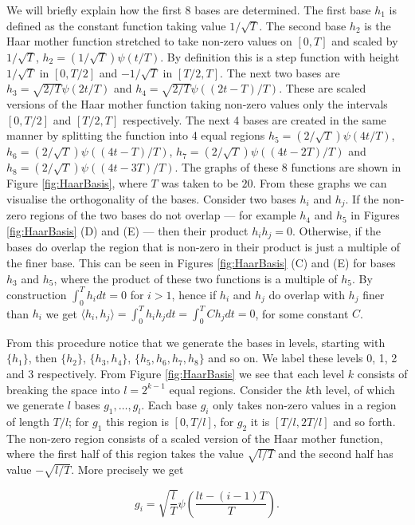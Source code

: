 \documentclass[../main.tex]{subfiles}
\begin{document}
 We will briefly explain how the first 8 bases are determined.  The first base $h_1$ is defined as the constant function taking value $1/ \sqrt T$. The second base $h_2$ is the Haar mother function stretched to take non-zero values on $[0,T]$ and scaled by $1/ \sqrt T$, $h_2 = (1/ \sqrt T)\psi(t/T)$. By definition this is a step function with  height $1/ \sqrt T$ in $[0,T/2]$ and $-1/ \sqrt T$ in $[T/2,T]$. The next two bases are $h_3 = \sqrt{2/T}\psi(2t/T)$ and $h_4 = \sqrt{2/T}\psi((2t-T)/T)$. These are scaled versions of the Haar mother function taking non-zero values only the intervals $[0,T/2]$ and $[T/2,T]$ respectively. The next 4 bases are created in the same manner by splitting the function into 4 equal regions $h_5 = (2/ \sqrt T)\psi(4t/T)$, $h_6 = (2/ \sqrt T)\psi((4t-T)/T)$, $h_7 = (2/ \sqrt T)\psi((4t-2T)/T)$ and $h_8 = (2/ \sqrt T)\psi((4t-3T)/T)$. The graphs of these 8 functions are shown in Figure \ref{fig:HaarBasis}, where $T$ was taken to be $20$. From these graphs we can visualise the orthogonality of the bases. Consider two bases $h_i$ and $h_j$. If the non-zero regions of the two bases do not overlap --- for example $h_4$ and $h_5$ in Figures \ref{fig:HaarBasis} (D) and (E) --- then their product $h_ih_j = 0$. Otherwise, if the bases do overlap the region that is non-zero in their product is just a multiple of the finer base. This can be seen in Figures \ref{fig:HaarBasis} (C) and (E) for bases $h_3$ and $h_5$, where the product of these two functions is a multiple of $h_5$. By construction $\int^T_0 h_i dt = 0$ for $i>1$, hence if $h_i$ and $h_j$ do overlap with $h_j$ finer than $h_i$ we get $\langle h_i,h_j \rangle = \int^T_0 h_i h_j dt = \int^T_0 C h_j dt = 0$, for some constant $C$.
 
    From this procedure notice that we generate the bases in levels, starting with $\{h_1\}$, then $\{h_2\}$, $\{h_3,h_4\}$, $\{h_5,h_6,h_7,h_8\}$ and so on. We label these levels 0, 1, 2 and 3 respectively. From Figure \ref{fig:HaarBasis} we see that each level $k$ consists of breaking the space into $l = 2^{k-1}$ equal regions. Consider the $k$th level, of which we generate $l$ bases $g_{1}, \dots, g_{l}$. Each base $g_i$ only takes non-zero values in a region of length $T/l$; for $g_1$ this region is $[0,T/l]$, for $g_2$ it is $[T/l,2T/l]$ and so forth. The non-zero region consists of a scaled version of the Haar mother function, where the first half of this region takes the value $\sqrt{l/ T}$ and the second half has value $-\sqrt{l/ T}$. More precisely we get 

$$g_{i} = \sqrt{\frac{l}{ T}}\psi \left( \frac{lt-(i-1)T}{T} \right).$$
\end{document}
